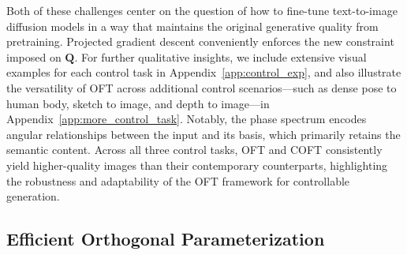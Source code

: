 Both of these challenges center on the question of how to fine-tune text-to-image diffusion models in a way that maintains the original generative quality from pretraining. Projected gradient descent conveniently enforces the new constraint imposed on $\bm{Q}$. For further qualitative insights, we include extensive visual examples for each control task in Appendix~\ref{app:control_exp}, and also illustrate the versatility of OFT across additional control scenarios—such as dense pose to human body, sketch to image, and depth to image—in Appendix~\ref{app:more_control_task}. Notably, the phase spectrum encodes angular relationships between the input and its basis, which primarily retains the semantic content. Across all three control tasks, OFT and COFT consistently yield higher-quality images than their contemporary counterparts, highlighting the robustness and adaptability of the OFT framework for controllable generation. \subsection{Efficient Orthogonal Parameterization}\label{sect:eff_ortho}

